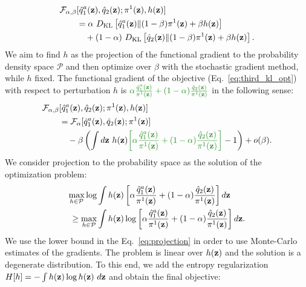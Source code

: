 \begin{equation}
\label{eq:objective}
    \begin{aligned}
    \mathcal{F}_{\alpha, \beta}&[\hat{q}_{1}^{a}(\rvz),\hat{q}_{2}(\rvz);\pi^{1}(\rvz),h(\rvz)] \\
    & = \alpha~\KL{\hat{q}_{1}^{a}(\rvz)}{(1-\beta)\pi^{1}(\rvz)+\beta h(\rvz)}  \\
    & \quad + (1-\alpha)~\KL{\hat{q}_{2}(\rvz)}{(1-\beta)\pi^{1}(\rvz)+\beta h(\rvz)}.
    \end{aligned}
\end{equation}
We aim to find $h$ as the projection of the functional gradient to the probability density space $\mathcal{P}$ and then optimize over $\beta$ with the stochastic gradient method, while $h$ fixed. The functional gradient of the objective (Eq.~\ref{eq:third_kl_opt}) with respect to perturbation $h$ is $\color{ForestGreen}{\alpha\frac{\hat{q}_{1}^{a}(\rvz)}{\pi^{1}(\rvz)} + (1-\alpha)\frac{\hat{q}_{2}(\rvz)}{\pi^{1}(\rvz)}}$ in the following sense:
\begin{equation}
    \begin{aligned}
     \mathcal{F}_{\alpha, \beta}&[\hat{q}_{1}^{a}(\rvz),\hat{q}_{2}(\rvz);\pi^{1}(\rvz),h(\rvz)]  \\ 
    & =  \mathcal{F}_{\alpha}[\hat{q}_{1}^{a}(\rvz),\hat{q}_{2}(\rvz);\pi^{1}(\rvz)]  \\
    & \quad - \beta\left(\int d\rvz~h(\rvz){\color{ForestGreen}{\left[\alpha \frac{\hat{q}_{1}^{a}(\rvz)}{\pi^{1}(\rvz)} + (1-\alpha)\frac{\hat{q}_{2}(\rvz)}{\pi^{1}(\rvz)}\right]}} - 1\right) + o(\beta).
    \end{aligned}
\end{equation}
We consider projection to the probability space as the solution of the optimization problem:
\begin{equation}
\label{eq:projection}
\begin{aligned}
 \max\limits_{h\in\mathcal{P}}\log & \int h(\rvz) \left[\alpha \frac{\hat{q}_{1}^{a}(\rvz)}{\pi^{1}(\rvz)} + (1-\alpha)\frac{\hat{q}_{2}(\rvz)}{\pi^{1}(\rvz)}\right]d\rvz  \\
 \geq \max\limits_{h\in\mathcal{P}}& \int h(\rvz)\log \left[\alpha \frac{\hat{q}_{1}^{a}(\rvz)}{\pi^{1}(\rvz)} + (1-\alpha)\frac{\hat{q}_{2}(\rvz)}{\pi^{1}(\rvz)} \right]d\rvz.
\end{aligned}
\end{equation}
We use the lower bound in the Eq.~\ref{eq:projection} in order to use Monte-Carlo estimates of the gradients. The problem is linear over $h({\mathbf{z}})$ and the solution is a degenerate distribution. To this end, we add the entropy regularization $H[h]=-\int h({\mathbf{z}}) \log h({\mathbf{z}}) ~d{\mathbf{z}}$ and obtain the final objective:
